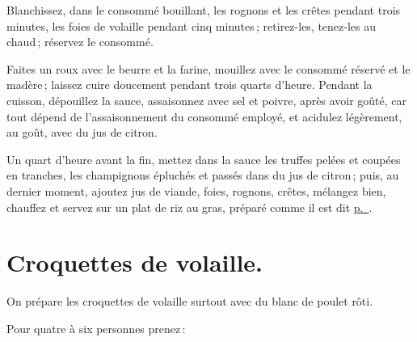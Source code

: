 Blanchissez, dans le consommé bouillant, les rognons et les crêtes pendant
trois minutes, les foies de volaille pendant cinq minutes ; retirez-les,
tenez-les au chaud ; réservez le consommé.

Faites un roux avec le beurre et la farine, mouillez avec le consommé réservé
et le madère ; laissez cuire doucement pendant trois quarts d'heure. Pendant la
cuisson, dépouillez la sauce, assaisonnez avec sel et poivre, après avoir
goûté, car tout dépend de l’assaisonnement du consommé employé, et acidulez
légèrement, au goût, avec du jus de citron.

Un quart d'heure avant la fin, mettez dans la sauce les truffes pelées et
coupées en tranches, les champignons épluchés et passés dans du jus de citron ;
puis, au dernier moment, ajoutez jus de viande, foies, rognons, crêtes,
mélangez bien, chauffez et servez sur un plat de riz au gras, préparé comme il
est dit \hyperlink{p0708}{p. \pageref{pg0708}}.

\section*{\centering Croquettes de volaille.}
{}

On prépare les croquettes de volaille surtout avec du blanc de poulet rôti.

\medskip

Pour quatre à six personnes prenez :

